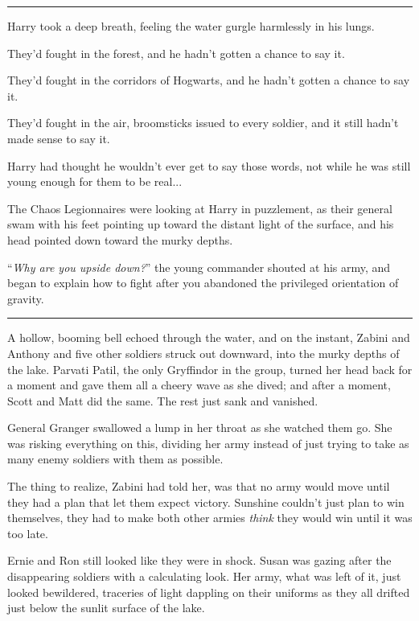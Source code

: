 \begin{center}\rule{3in}{0.4pt}\end{center}

Harry took a deep breath, feeling the water gurgle harmlessly in his lungs.

They'd fought in the forest, and he hadn't gotten a chance to say it.

They'd fought in the corridors of Hogwarts, and he hadn't gotten a chance to say it.

They'd fought in the air, broomsticks issued to every soldier, and it still hadn't made sense to say it.

Harry had thought he wouldn't ever get to say those words, not while he was still young enough for them to be real...

The Chaos Legionnaires were looking at Harry in puzzlement, as their general swam with his feet pointing up toward the distant light of the surface, and his head pointed down toward the murky depths.

``\emph{Why are you upside down?}'' the young commander shouted at his army, and began to explain how to fight after you abandoned the privileged orientation of gravity.

\begin{center}\rule{3in}{0.4pt}\end{center}

A hollow, booming bell echoed through the water, and on the instant, Zabini and Anthony and five other soldiers struck out downward, into the murky depths of the lake. Parvati Patil, the only Gryffindor in the group, turned her head back for a moment and gave them all a cheery wave as she dived; and after a moment, Scott and Matt did the same. The rest just sank and vanished.

General Granger swallowed a lump in her throat as she watched them go. She was risking everything on this, dividing her army instead of just trying to take as many enemy soldiers with them as possible.

The thing to realize, Zabini had told her, was that no army would move until they had a plan that let them expect victory. Sunshine couldn't just plan to win themselves, they had to make both other armies \emph{think} they would win until it was too late.

Ernie and Ron still looked like they were in shock. Susan was gazing after the disappearing soldiers with a calculating look. Her army, what was left of it, just looked bewildered, traceries of light dappling on their uniforms as they all drifted just below the sunlit surface of the lake.

